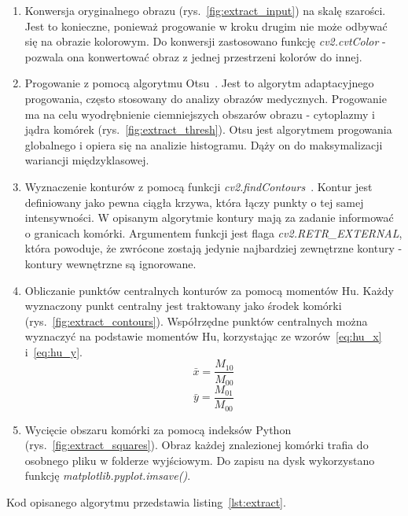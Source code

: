 \begin{enumerate}
    \item Konwersja oryginalnego obrazu (rys.~\ref{fig:extract_input}) na skalę szarości.
    Jest to konieczne, ponieważ progowanie w kroku drugim nie może odbywać się na obrazie kolorowym.
    Do konwersji zastosowano funkcję \textit{cv2.cvtColor} - pozwala ona konwertować obraz z jednej przestrzeni kolorów do innej.
    \item Progowanie z pomocą algorytmu Otsu~\cite{otsu}.
    Jest to algorytm adaptacyjnego progowania, często stosowany do analizy obrazów medycznych.
    Progowanie ma na celu wyodrębnienie ciemniejszych obszarów obrazu - cytoplazmy i jądra komórek (rys.~\ref{fig:extract_thresh}). Otsu jest algorytmem progowania globalnego i opiera się na analizie histogramu.
    Dąży on do maksymalizacji wariancji międzyklasowej.
    \item Wyznaczenie konturów z pomocą funkcji \textit{cv2.findContours}~\cite{contours}.
    Kontur jest definiowany jako pewna ciągła krzywa, która łączy punkty o tej samej intensywności.
    W opisanym algorytmie kontury mają za zadanie informować o granicach komórki.
    Argumentem funkcji jest flaga \textit{cv2.RETR\_EXTERNAL}, która powoduje, że zwrócone zostają jedynie najbardziej zewnętrzne kontury - kontury wewnętrzne są ignorowane.
    \item Obliczanie punktów centralnych konturów za pomocą momentów Hu. Każdy wyznaczony punkt centralny jest traktowany jako środek komórki (rys.~\ref{fig:extract_contours}).
    Współrzędne punktów centralnych można wyznaczyć na podstawie momentów Hu, korzystając ze wzorów~\ref{eq:hu_x} i~\ref{eq:hu_y}.
    \begin{equation}
        \bar{x} = \dfrac{M_{10}}{M_{00}}\label{eq:hu_x}
    \end{equation}
    \begin{equation}
        \bar{y} = \dfrac{M_{01}}{M_{00}}\label{eq:hu_y}
    \end{equation}
    \item Wycięcie obszaru komórki za pomocą indeksów Python (rys.~\ref{fig:extract_squares}). Obraz każdej znalezionej komórki trafia do osobnego pliku w folderze wyjściowym.
    Do zapisu na dysk wykorzystano funkcję \textit{matplotlib.pyplot.imsave()}.
\end{enumerate}

Kod opisanego algorytmu przedstawia listing~\ref{lst:extract}.

